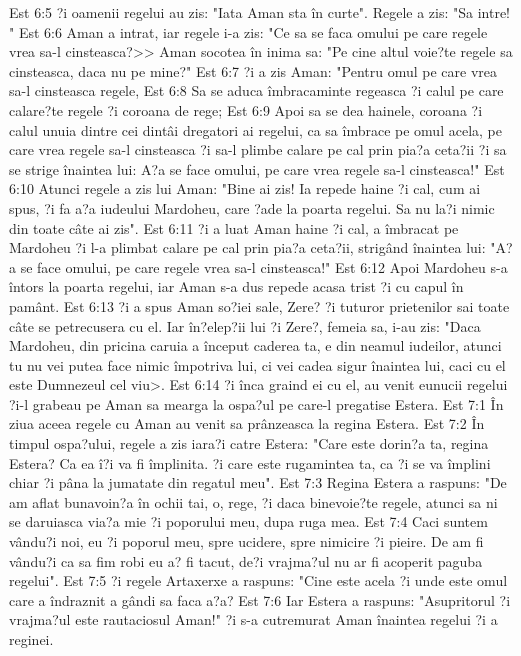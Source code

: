 Est 6:5  ?i oamenii regelui au zis: "Iata Aman sta în curte". Regele a zis: "Sa intre! "
Est 6:6  Aman a intrat, iar regele i-a zis: "Ce sa se faca omului pe care regele vrea sa-l cinsteasca?>> Aman socotea în inima sa: "Pe cine altul voie?te regele sa cinsteasca, daca nu pe mine?"
Est 6:7  ?i a zis Aman: "Pentru omul pe care vrea sa-l cinsteasca regele,
Est 6:8  Sa se aduca îmbracaminte regeasca ?i calul pe care calare?te regele ?i coroana de rege;
Est 6:9  Apoi sa se dea hainele, coroana ?i calul unuia dintre cei dintâi dregatori ai regelui, ca sa îmbrace pe omul acela, pe care vrea regele sa-l cinsteasca ?i sa-l plimbe calare pe cal prin pia?a ceta?ii ?i sa se strige înaintea lui: A?a se face omului, pe care vrea regele sa-l cinsteasca!"
Est 6:10  Atunci regele a zis lui Aman: "Bine ai zis! Ia repede haine ?i cal, cum ai spus, ?i fa a?a iudeului Mardoheu, care ?ade la poarta regelui. Sa nu la?i nimic din toate câte ai zis".
Est 6:11  ?i a luat Aman haine ?i cal, a îmbracat pe Mardoheu ?i l-a plimbat calare pe cal prin pia?a ceta?ii, strigând înaintea lui: "A?a se face omului, pe care regele vrea sa-l cinsteasca!"
Est 6:12  Apoi Mardoheu s-a întors la poarta regelui, iar Aman s-a dus repede acasa trist ?i cu capul în pamânt.
Est 6:13  ?i a spus Aman so?iei sale, Zere? ?i tuturor prietenilor sai toate câte se petrecusera cu el. Iar în?elep?ii lui ?i Zere?, femeia sa, i-au zis: "Daca Mardoheu, din pricina caruia a început caderea ta, e din neamul iudeilor, atunci tu nu vei putea face nimic împotriva lui, ci vei cadea sigur înaintea lui, caci cu el este Dumnezeul cel viu>.
Est 6:14  ?i înca graind ei cu el, au venit eunucii regelui ?i-l grabeau pe Aman sa mearga la ospa?ul pe care-l pregatise Estera.
Est 7:1  În ziua aceea regele cu Aman au venit sa prânzeasca la regina Estera.
Est 7:2  În timpul ospa?ului, regele a zis iara?i catre Estera: "Care este dorin?a ta, regina Estera? Ca ea î?i va fi împlinita. ?i care este rugamintea ta, ca ?i se va împlini chiar ?i pâna la jumatate din regatul meu".
Est 7:3  Regina Estera a raspuns: "De am aflat bunavoin?a în ochii tai, o, rege, ?i daca binevoie?te regele, atunci sa ni se daruiasca via?a mie ?i poporului meu, dupa ruga mea.
Est 7:4  Caci suntem vându?i noi, eu ?i poporul meu, spre ucidere, spre nimicire ?i pieire. De am fi vându?i ca sa fim robi eu a? fi tacut, de?i vrajma?ul nu ar fi acoperit paguba regelui".
Est 7:5  ?i regele Artaxerxe a raspuns: "Cine este acela ?i unde este omul care a îndraznit a gândi sa faca a?a?
Est 7:6  Iar Estera a raspuns: "Asupritorul ?i vrajma?ul este rautaciosul Aman!" ?i s-a cutremurat Aman înaintea regelui ?i a reginei.
